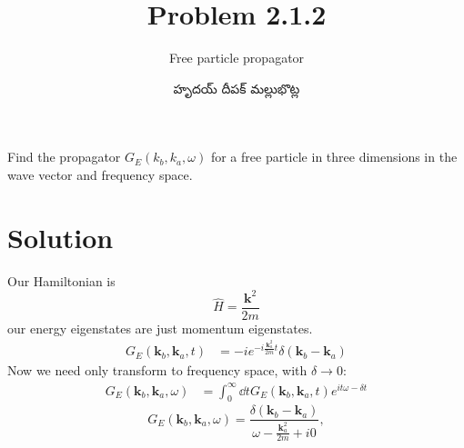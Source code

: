 \documentclass{article}
\title{Problem 2.1.2}
\subtitle{Free particle propagator}
\author{\begin{telugu}హృదయ్ దీపక్ మల్లుభొట్ల\end{telugu}}
\date{}
\renewcommand{\vec}[1]{\mathbf{#1}}
\newcommand{\ham}{\hat{H}}
\begin{document}
	\maketitle
	Find the propagator $G_E(k_b, k_a, \omega)$ for a free particle in three dimensions in the wave vector and frequency space.

	\section{Solution} \label{sec:solution}

	Our Hamiltonian is
	\begin{equation}
		\ham = \frac{\vec{k}^2}{2m}
	\end{equation}
	\triv our energy eigenstates are just momentum eigenstates.
	\thrf
	\begin{align}
		G_E(\vec{k}_b, \vec{k}_a, t) &= -i e^{-i \frac{\vec{k}_a^2}{2m} t} \delta(\vec{k}_b - \vec{k}_a)
	\end{align}
	Now we need only transform to frequency space, with $\delta \rightarrow 0$:
	\begin{align}
		G_E(\vec{k}_b, \vec{k}_a, \omega) &= \int_0^\infty \dd{t} G_E(\vec{k}_b, \vec{k}_a, t) e^{i t \omega - \delta t}
	\end{align}
	\triv
	\begin{equation}
		G_E(\vec{k}_b, \vec{k}_a, \omega) =  \frac{\delta(\vec{k}_b - \vec{k}_a)}{\omega - \frac{\vec{k}_a^2}{2m} + i 0},
	\end{equation}
\end{document}
